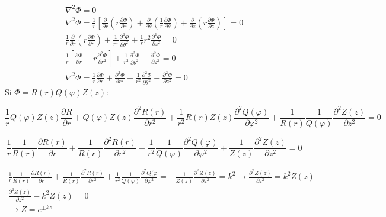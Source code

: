 \documentclass{article}
\begin{document}
\begin{equation}
    \begin{gathered}
    \nabla^2 \Phi = 0 \\
    \nabla^2 \Phi = \frac{1}{r} \left [ \frac{\partial}{\partial r} \left ( r \frac{\partial \Phi}{\partial r} \right ) + 
    \frac{\partial}{\partial \theta} \left ( \frac{1}{r} \frac{\partial \Phi}{\partial \theta} \right ) + 
    \frac{\partial}{\partial z} \left ( r \frac{\partial \Phi}{\partial z} \right )
    \right ]  = 0\\
    \frac{1}{r} \frac{\partial}{\partial r} \left ( r \frac{\partial \Phi}{\partial r} \right) + \frac{1}{r^1} \frac{\partial ^2 \Phi}{\partial \theta^2} + \frac{1}{r}r^2 \frac{\partial ^2 \Phi}{\partial z^2} = 0\\
    \frac{1}{r} \left[ \frac{\partial \Phi}{\partial r} + r \frac{\partial^2 \Phi}{\partial r^2} \right] + \frac{1}{r^2} \frac{\partial^2 \Phi}{\partial \theta^2} + \frac{\partial^2\Phi}{\partial z^2} = 0 \\
    \nabla^2 \Phi = \frac{1}{r}\frac{\partial \Phi}{\partial r} + \frac{\partial^2 \Phi }{\partial r^2} + \frac{1}{r^2} \frac{\partial ^2 \Phi}{\partial \theta^2} + \frac{\partial^2 \Phi}{\partial z^2}= 0
    \end{gathered}
\end{equation}
Si $\Phi = R(r)Q(\varphi)Z(z)$:


\begin{equation}
\frac{1}{r} Q( \varphi)Z(z) \frac{\partial R}{\partial r} + Q(\varphi)Z(z)\frac{\partial ^2 R(r)}{\partial r^2} + \frac{1}{r^2} R(r)Z(z) \frac{\partial^2 Q(\varphi)}{\partial \varphi^2} + \frac{1}{R(r)}\frac{1}{Q(\varphi)} \frac{\partial^2 Z(z)}{\partial z^2} = 0   
\end{equation}

\begin{equation}
\frac{1}{r}\frac{1}{R(r)}\frac{\partial R(r)}{\partial r} + \frac{1}{R(r)}\frac{\partial^2 R(r)}{\partial r^2} + \frac{1}{r^2} \frac{1}{Q(\varphi)} \frac{\partial^2 Q(\varphi)}{\partial \varphi^2} + \frac{1}{Z(z)}\frac{\partial^2 Z(z)}{\partial z^2} = 0    
\end{equation}

\begin{equation}
\begin{gathered}
    \frac{1}{r} \frac{1}{R(r)}\frac{\partial R(r) }{\partial r} + \frac{1}{R(r)}\frac{\partial^2 R(r)}{\partial r^2} + \frac{1}{r^2}\frac{1}{Q(\varphi)}\frac{\partial^2 Q(\varphi}{\partial \varphi^2} = -\frac{1}{Z(z)}\frac{\partial^2 Z(z)}{\partial z^2} = k^2  \to \frac{\partial^2 Z(z)}{\partial z^2} = k^2 Z(z) \\
    \frac{\partial^2 Z(z)}{\partial z^2} - k^2 Z(z) = 0 \\
    \to Z = e^{\pm kz}
\end{gathered}
\end{equation}
\end{document}
